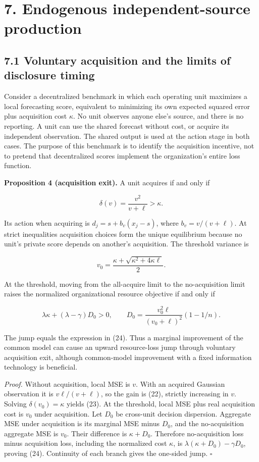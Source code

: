 \documentclass[
  11pt,
]{article}
\begin{document}
\section{7. Endogenous independent-source
production}\label{endogenous-independent-source-production}

\subsection{7.1 Voluntary acquisition and the limits of disclosure
timing}\label{voluntary-acquisition-and-the-limits-of-disclosure-timing}

Consider a decentralized benchmark in which each operating unit
maximizes a local forecasting score, equivalent to minimizing its own
expected squared error plus acquisition cost \(\kappa\). No unit
observes anyone else's source, and there is no reporting. A unit can use
the shared forecast without cost, or acquire its independent
observation. The shared output is used at the action stage in both
cases. The purpose of this benchmark is to identify the acquisition
incentive, not to pretend that decentralized scores implement the
organization's entire loss function.

\textbf{Proposition 4 (acquisition exit).} A unit acquires if and only
if

\[\delta(v)=\frac{v^2}{v+\ell}>\kappa. \tag{22}\]

Its action when acquiring is \(d_j=s+b_v(x_j-s)\), where
\(b_v=v/(v+\ell)\). At strict inequalities acquisition choices form the
unique equilibrium because no unit's private score depends on another's
acquisition. The threshold variance is

\[v_0=\frac{\kappa+\sqrt{\kappa^2+4\kappa\ell}}2. \tag{23}\]

At the threshold, moving from the all-acquire limit to the
no-acquisition limit raises the normalized organizational resource
objective if and only if

\[\lambda\kappa+(\lambda-\gamma)D_0>0,\qquad
D_0=\frac{v_0^2\ell}{(v_0+\ell)^2}(1-1/n). \tag{24}\]

The jump equals the expression in (24). Thus a marginal improvement of
the common model can cause an upward resource-loss jump through
voluntary acquisition exit, although common-model improvement with a
fixed information technology is beneficial.

\emph{Proof.} Without acquisition, local MSE is \(v\). With an acquired
Gaussian observation it is \(v\ell/(v+\ell)\), so the gain is (22),
strictly increasing in \(v\). Solving \(\delta(v_0)=\kappa\) yields
(23). At the threshold, local MSE plus real acquisition cost is \(v_0\)
under acquisition. Let \(D_0\) be cross-unit decision dispersion.
Aggregate MSE under acquisition is its marginal MSE minus \(D_0\), and
the no-acquisition aggregate MSE is \(v_0\). Their difference is
\(\kappa+D_0\). Therefore no-acquisition loss minus acquisition loss,
including the normalized cost \(\kappa\), is
\(\lambda(\kappa+D_0)-\gamma D_0\), proving (24). Continuity of each
branch gives the one-sided jump. \(\square\)
\end{document}
